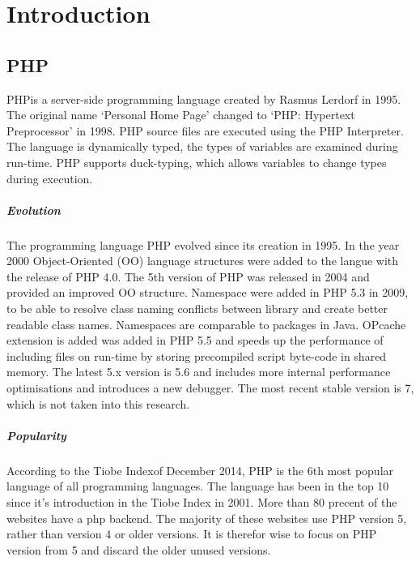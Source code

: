 \documentclass[../main.tex]{subfiles}
\begin{document}
    \chapter{Introduction}\label{ch:introduction}

    \section{PHP} %
        PHP\footnotemark is a server-side programming language created by Rasmus Lerdorf in 1995.
        The original name `Personal Home Page' changed to `PHP: Hypertext Preprocessor' in 1998.
        PHP source files are executed using the PHP Interpreter. 
        The language is dynamically typed, the types of variables are examined during run-time.
        PHP supports duck-typing, which allows variables to change types during execution.
        
        \paragraph{Evolution}
        The programming language PHP evolved since its creation in 1995.
        In the year 2000 Object-Oriented (OO) language structures were added to the langue with the release of PHP 4.0.
        The 5th version of PHP was released in 2004 and provided an improved OO structure.
        Namespace were added in PHP 5.3 in 2009, to be able to resolve class naming conflicts between library and create better readable class names.
        Namespaces are comparable to packages in Java.
        OPcache extension is added was added in PHP 5.5 and speeds up the performance of including files on run-time by storing precompiled script byte-code in shared memory.
        The latest 5.x version is 5.6 and includes more internal performance optimisations and introduces a new debugger.
        The most recent stable version is 7, which is not taken into this research.
       
        \paragraph{Popularity}
        According to the Tiobe Index\footnotemark of December 2014, PHP is the 6th most popular language of all programming languages.
        The language has been in the top 10 since it's introduction in the Tiobe Index in 2001.
        More than 80 precent of the websites have a php backend\footnotemark.
        The majority of these websites use PHP version 5, rather than version 4 or older versions.
        It is therefor wise to focus on PHP version from 5 and discard the older unused versions.
            
\end{document}
